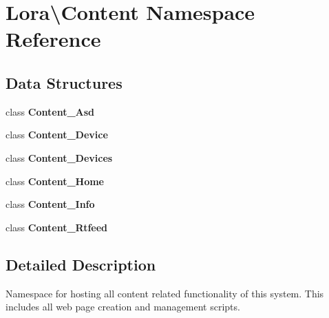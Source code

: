 \section{Lora\textbackslash{}Content Namespace Reference}
\label{namespace_lora_1_1_content}
\subsection*{Data Structures}
\begin{DoxyCompactItemize}
\item 
class \textbf{ Content\+\_\+\+Asd}
\item 
class \textbf{ Content\+\_\+\+Device}
\item 
class \textbf{ Content\+\_\+\+Devices}
\item 
class \textbf{ Content\+\_\+\+Home}
\item 
class \textbf{ Content\+\_\+\+Info}
\item 
class \textbf{ Content\+\_\+\+Rtfeed}
\end{DoxyCompactItemize}


\subsection{Detailed Description}
Namespace for hosting all content related functionality of this system. This includes all web page creation and management scripts. 